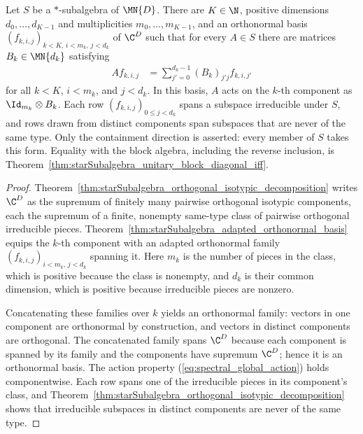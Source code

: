 \begin{theorem}%
    \label{thm:starSubalgebra_global_adapted_orthonormal_basis}
    \leanok
    Let $S$ be a $*$-subalgebra of $\MN{D}$. There are $K\in\N$, positive dimensions $d_0,\ldots,d_{K-1}$ and multiplicities
    $m_0,\ldots,m_{K-1}$, and an orthonormal basis $(f_{k,i,j})_{k<K,\,i<m_k,\,j<d_k}$ of $\C^D$ such that for every
    $A\in S$ there are matrices $B_k\in\MN{d_k}$ satisfying
    \begin{align}
        A f_{k,i,j}
        &=\sum_{j'=0}^{d_k-1}(B_k)_{j'j}f_{k,i,j'}
        \label{eq:spectral_global_action}
    \end{align}
    for all $k<K$, $i<m_k$, and $j<d_k$. In this basis, $A$ acts on the $k$-th component as $\Id_{m_k}\otimes B_k$. Each row
    $(f_{k,i,j})_{0\leq j<d_k}$ spans a subspace irreducible under $S$, and rows drawn from distinct components span subspaces that are never of the
    same type. Only the containment direction is asserted: every member of $S$ takes this form. Equality with the block algebra, including the
    reverse inclusion, is
    Theorem~\ref{thm:starSubalgebra_unitary_block_diagonal_iff}.
\end{theorem}

\begin{proof}
    \leanok
    Theorem~\ref{thm:starSubalgebra_orthogonal_isotypic_decomposition}
    writes $\C^D$ as the supremum of finitely many pairwise orthogonal
    isotypic components, each the supremum of a finite, nonempty same-type
    class of pairwise orthogonal irreducible pieces.
    Theorem~\ref{thm:starSubalgebra_adapted_orthonormal_basis} equips the
    $k$-th component with an adapted orthonormal family
    $(f_{k,i,j})_{i<m_k,\,j<d_k}$ spanning it. Here $m_k$ is the number of
    pieces in the class, which is positive because the class is nonempty,
    and $d_k$ is their common dimension, which is positive because
    irreducible pieces are nonzero.

    Concatenating these families over $k$ yields an orthonormal family:
    vectors in one component are orthonormal by construction, and vectors
    in distinct components are orthogonal. The concatenated family spans
    $\C^D$ because each component is spanned by its family and the
    components have supremum $\C^D$; hence it is an orthonormal basis.
    The action property (\ref{eq:spectral_global_action}) holds
    componentwise. Each row spans one of the irreducible pieces in its
    component's class, and
    Theorem~\ref{thm:starSubalgebra_orthogonal_isotypic_decomposition}
    shows that irreducible subspaces in distinct components are never of the
    same type.
\end{proof}

